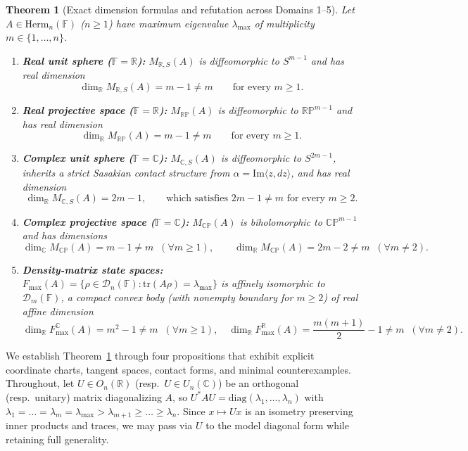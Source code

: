 \documentclass[11pt,a4paper]{article}
\newtheorem{theorem}{Theorem}[section]
\theoremstyle{definition}
\theoremstyle{remark}
\newcommand{\RR}{\mathbb{R}}
\newcommand{\CC}{\mathbb{C}}
\newcommand{\FF}{\mathbb{F}}
\newcommand{\RP}{\mathbb{RP}}
\newcommand{\CP}{\mathbb{CP}}
\newcommand{\cD}{\mathcal{D}}
\newcommand{\Herm}{\mathrm{Herm}}
\newcommand{\tr}{\mathrm{tr}}
\newcommand{\diag}{\mathrm{diag}}
\newcommand{\im}{\mathrm{Im}}
\begin{document}
\begin{theorem}[Exact dimension formulas and refutation across Domains 1--5]
\label{thm:five_domains}
Let $A \in \Herm_n(\FF)$ ($n \ge 1$) have maximum eigenvalue $\lambda_{\max}$ of multiplicity $m \in \{1, \dots, n\}$.
\begin{enumerate}
  \item[(1)] \textbf{Real unit sphere ($\FF = \RR$):} $M_{\RR, S}(A)$ is diffeomorphic to $S^{m-1}$ and has real dimension
  \[
    \dim_{\RR} M_{\RR, S}(A) = m - 1 \neq m \qquad \text{for every } m \ge 1.
  \]
  \item[(2)] \textbf{Real projective space ($\FF = \RR$):} $M_{\RP}(A)$ is diffeomorphic to $\RP^{m-1}$ and has real dimension
  \[
    \dim_{\RR} M_{\RP}(A) = m - 1 \neq m \qquad \text{for every } m \ge 1.
  \]
  \item[(3)] \textbf{Complex unit sphere ($\FF = \CC$):} $M_{\CC, S}(A)$ is diffeomorphic to $S^{2m-1}$, inherits a strict Sasakian contact structure from $\alpha = \im\langle z, dz \rangle$, and has real dimension
  \[
    \dim_{\RR} M_{\CC, S}(A) = 2m - 1, \qquad \text{which satisfies } 2m - 1 \neq m \text{ for every } m \ge 2.
  \]
  \item[(4)] \textbf{Complex projective space ($\FF = \CC$):} $M_{\CP}(A)$ is biholomorphic to $\CP^{m-1}$ and has dimensions
  \[
    \dim_{\CC} M_{\CP}(A) = m - 1 \neq m \;\; (\forall m \ge 1), \qquad
    \dim_{\RR} M_{\CP}(A) = 2m - 2 \neq m \;\; (\forall m \neq 2).
  \]
  \item[(5)] \textbf{Density-matrix state spaces:} $F_{\max}(A) = \{\rho \in \cD_n(\FF) : \tr(A \rho) = \lambda_{\max}\}$ is affinely isomorphic to $\cD_m(\FF)$, a compact convex body (with nonempty boundary for $m \ge 2$) of real affine dimension
  \[
    \dim_{\RR} F_{\max}^{\CC}(A) = m^2 - 1 \neq m \;\; (\forall m \ge 1), \quad
    \dim_{\RR} F_{\max}^{\RR}(A) = \frac{m(m+1)}{2} - 1 \neq m \;\; (\forall m \neq 2).
  \]
\end{enumerate}
\end{theorem}

We establish Theorem~\ref{thm:five_domains} through four propositions that exhibit explicit coordinate charts, tangent spaces, contact forms, and minimal counterexamples. Throughout, let $U \in O_n(\RR)$ (resp.\ $U \in U_n(\CC)$) be an orthogonal (resp.\ unitary) matrix diagonalizing $A$, so $U^* A U = \diag(\lambda_1, \dots, \lambda_n)$ with $\lambda_1 = \dots = \lambda_m = \lambda_{\max} > \lambda_{m+1} \ge \dots \ge \lambda_n$. Since $x \mapsto U x$ is an isometry preserving inner products and traces, we may pass via $U$ to the model diagonal form while retaining full generality.
\end{document}
